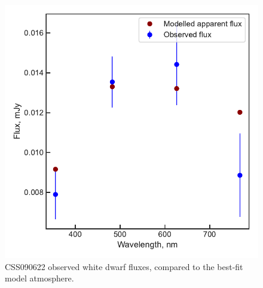 \begin{figure}
    \centering
    \includegraphics[width=\textwidth]{figures/results/CSS090622/fluxplot.pdf}
    \caption{CSS090622 observed white dwarf fluxes, compared to the best-fit model atmosphere.}
    \label{fig:CSS090622 flux plot}
\end{figure}
\clearpage


